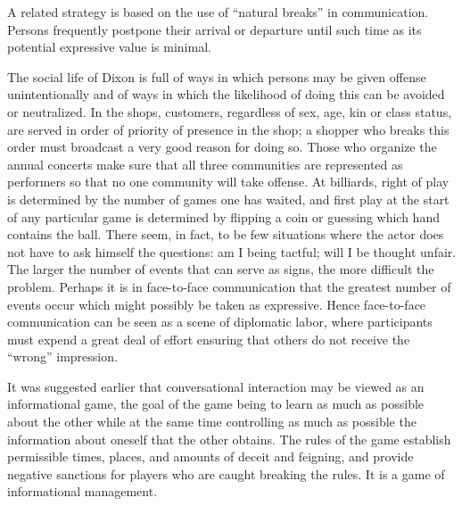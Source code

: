 \documentclass[twoside,symmetric,nobib,justified]{tufte-book}
\begin{document}
A related strategy is based on the use of ``natural breaks'' in
communication. Persons frequently postpone their arrival or departure
until such time as its potential expressive value is minimal.

The social life of Dixon is full of ways in which persons may be given
offense unintentionally and of ways in which the likelihood of doing
this can be avoided or neutralized. In the shops, customers, regardless
of sex, age, kin or class status, are served in order of priority of
presence in the shop; a shopper who breaks this order must broadcast a
very good reason for doing so. Those who organize the annual concerts
make sure that all three communities are represented as performers so
that no one community will take offense. At billiards, right of play is
determined by the number of games one has waited, and first play at the
start of any particular game is determined by flipping a coin or
guessing which hand contains the ball. There seem, in fact, to be few
situations where the actor does not have to ask himself the questions:
am I being tactful; will I be thought unfair. The larger the number of
events that can serve as signs, the more difficult the problem. Perhaps
it is in face-to-face communication that the greatest number of events
occur which might possibly be taken as expressive. Hence face-to-face
communication can be seen as a scene of diplomatic labor, where
participants must expend a great deal of effort ensuring that others do
not receive the ``wrong'' impression.

It was suggested earlier that conversational interaction may be viewed
as an informational game, the goal of the game being to learn as much as
possible about the other while at the same time controlling as much as
possible the information about oneself that the other obtains. The rules
of the game establish permissible times, places, and amounts of deceit
and feigning, and provide negative sanctions for players who are caught
breaking the rules. It is a game of informational management.
\end{document}
